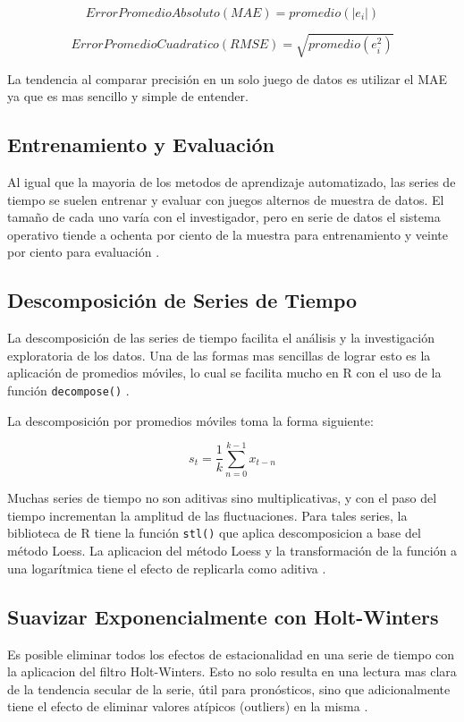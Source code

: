 \documentclass[letterpaper, spanish, 11pt]{report}
\begin{document}
\[Error Promedio Absoluto (MAE) = promedio(|e_{i}|)\]

\[ Error Promedio Cuadratico (RMSE) = \sqrt{promedio(e_{i}^2)}  \]

La tendencia al comparar precisión en un solo juego de datos es utilizar el MAE ya que es mas sencillo y simple de entender.

\subsection{Entrenamiento y Evaluación}
Al igual que la mayoria de los metodos de aprendizaje automatizado, las series de tiempo se suelen entrenar y evaluar con juegos alternos de muestra de datos. El tamaño de cada uno varía con el investigador, pero en serie de datos el sistema operativo tiende a ochenta por ciento de la muestra para entrenamiento y veinte por ciento para evaluación \cite{hyndman}.

\subsection{Descomposición de Series de Tiempo}
La descomposición de las series de tiempo facilita el análisis y la investigación exploratoria de los datos. Una de las formas mas sencillas de lograr esto es la aplicación de promedios móviles, lo cual se facilita mucho en R con el uso de la función \texttt{decompose()} \cite{daroczi}.

La descomposición por promedios móviles toma la forma siguiente:

\[ s_{t} = \frac{1}{k} \sum_{n = 0}^{k - 1} x_{t - n}  \]

Muchas series de tiempo no son aditivas sino multiplicativas, y con el paso del tiempo incrementan la amplitud de las fluctuaciones. Para tales series, la biblioteca de R tiene la función \texttt{stl()} que aplica descomposicion a base del método Loess. La aplicacion del método Loess y la transformación de la función a una logarítmica tiene el efecto de replicarla como aditiva \cite{viswanathan}.

\subsection{Suavizar Exponencialmente con Holt-Winters}
Es posible eliminar todos los efectos de estacionalidad en una serie de tiempo con la aplicacion del filtro Holt-Winters. Esto no solo resulta en una lectura mas clara de la tendencia secular de la serie, útil para pronósticos, sino que adicionalmente tiene el efecto de eliminar valores atípicos (outliers) en la misma \cite{daroczi}.
\end{document}
